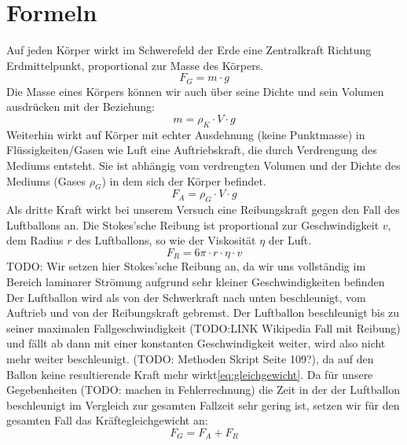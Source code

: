 \documentclass{article}
\begin{document}
    \section{Formeln}
    Auf jeden Körper wirkt im Schwerefeld der Erde eine Zentralkraft Richtung Erdmittelpunkt, proportional zur Masse des Körpers.
    \begin{equation} \label{eq:schwerkraft}
        F_G = m \cdot g    
    \end{equation}
    Die Masse eines Körpers können wir auch über seine Dichte und sein Volumen ausdrücken mit der Beziehung:
    \begin{equation} \label{eq:masse_dichte_rel}
        m = \rho_K \cdot V \cdot g
    \end{equation}
    Weiterhin wirkt auf Körper mit echter Ausdehnung (keine Punktmasse) in Flüssigkeiten/Gasen wie Luft eine Auftriebskraft, 
    die durch Verdrengung des Mediums entsteht. Sie ist abhängig vom verdrengten Volumen und der Dichte des Mediums (Gases \(\rho_G\)) in dem sich der Körper befindet.
    \begin{equation} \label{eq:auftrieb}
        F_A = \rho_{G} \cdot V \cdot g
    \end{equation}
    Als dritte Kraft wirkt bei unserem Versuch eine Reibungskraft gegen den Fall des Luftballons an.
    Die Stokes'sche Reibung ist proportional zur Geschwindigkeit \(v\), dem Radius \(r\) des Luftballons, so wie der Viskosität \( \eta \) der Luft.
    \begin{equation} \label{eq:stokes_reibung}
        F_R = 6 \pi \cdot r \cdot \eta \cdot v
    \end{equation}
    TODO: Wir setzen hier Stokes'sche Reibung an, da wir uns vollständig im Bereich laminarer Strömung aufgrund sehr kleiner Geschwindigkeiten befinden
    Der Luftballon wird als von der Schwerkraft nach unten beschleunigt, vom Auftrieb und von der Reibungskraft gebremst.
    Der Luftballon beschleunigt bis zu seiner maximalen Fallgeschwindigkeit (TODO:LINK Wikipedia Fall mit Reibung) und fällt ab dann mit einer konstanten Geschwindigkeit weiter,
    wird also nicht mehr weiter beschleunigt. (TODO: Methoden Skript Seite 109?), da auf den Ballon keine resultierende Kraft mehr wirkt\ref{eq:gleichgewicht}.
    Da für unsere Gegebenheiten (TODO: machen in Fehlerrechnung) die Zeit in der der Luftballon beschleunigt im Vergleich zur gesamten Fallzeit sehr gering ist,
    setzen wir für den gesamten Fall das Kräftegleichgewicht an:
    \begin{equation} \label{eq:gleichgewicht}
        F_G = F_A + F_R
    \end{equation}
\end{document}
